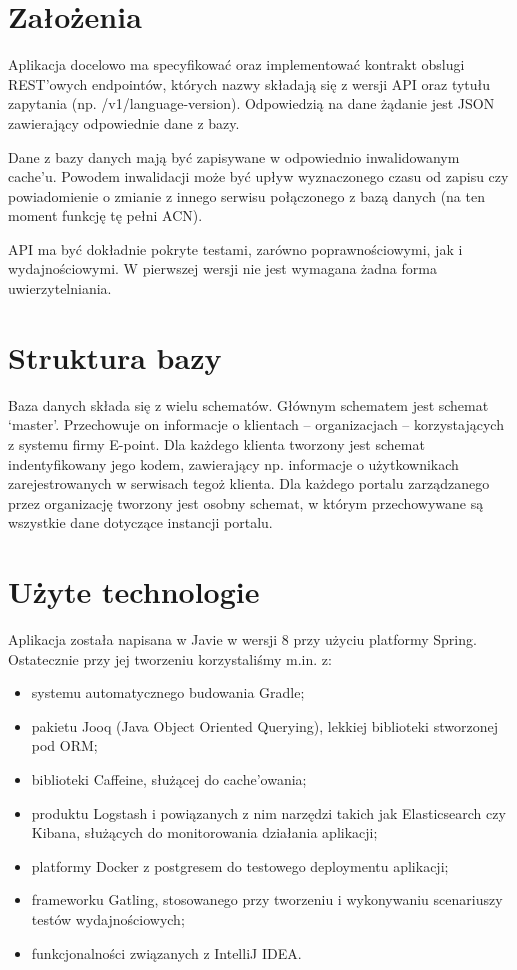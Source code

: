\documentclass[licencjacka]{pracamgr}
\begin{document}
\section{Założenia}

Aplikacja docelowo ma specyfikować oraz implementować kontrakt obslugi REST’owych endpointów, których nazwy składają się z wersji API oraz tytułu zapytania (np. /v1/language-version). Odpowiedzią na dane żądanie jest JSON zawierający odpowiednie dane z bazy.

\vspace{1mm}

Dane z bazy danych mają być zapisywane w odpowiednio inwalidowanym cache’u. Powodem inwalidacji może być upływ wyznaczonego czasu od zapisu czy powiadomienie o zmianie z innego serwisu połączonego z bazą danych (na ten moment funkcję tę pełni ACN).

\vspace{1mm}
	
API ma być dokładnie pokryte testami, zarówno poprawnościowymi, jak i wydajnościowymi. W pierwszej wersji nie jest wymagana żadna forma uwierzytelniania.

\section{Struktura bazy}

Baza danych składa się z wielu schematów. Głównym schematem jest schemat ‘master’. Przechowuje on informacje o klientach – organizacjach – korzystających z systemu firmy E-point. Dla każdego klienta tworzony jest schemat indentyfikowany jego kodem, zawierający np. informacje o użytkownikach zarejestrowanych w serwisach tegoż klienta. Dla każdego portalu zarządzanego przez organizację tworzony jest osobny schemat, w którym przechowywane są wszystkie dane dotyczące instancji portalu.

\pagebreak

\section{Użyte technologie}

Aplikacja została napisana w Javie w wersji 8 przy użyciu platformy Spring. Ostatecznie przy jej tworzeniu korzystaliśmy m.in. z:
\begin{itemize}
\item systemu automatycznego budowania Gradle;
\item pakietu Jooq (Java Object Oriented Querying), lekkiej biblioteki stworzonej pod ORM;
\item biblioteki Caffeine, służącej do cache’owania;
\item produktu Logstash i powiązanych z nim narzędzi takich jak Elasticsearch czy Kibana, służących do monitorowania działania aplikacji;
\item platformy Docker z postgresem do testowego deploymentu aplikacji;
\item frameworku Gatling, stosowanego przy tworzeniu i wykonywaniu scenariuszy testów wydajnościowych;
\item funkcjonalności związanych z IntelliJ IDEA.
\end{itemize}
\end{document}
